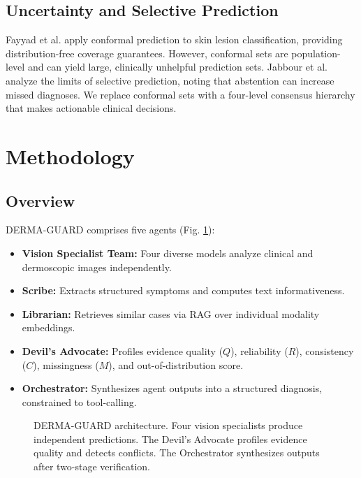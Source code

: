 \documentclass[conference]{IEEEtran}
\begin{document}
\subsection{Uncertainty and Selective Prediction}

Fayyad et al. \cite{fayyad2024} apply conformal prediction to skin lesion classification, providing distribution-free coverage guarantees. However, conformal sets are population-level and can yield large, clinically unhelpful prediction sets. Jabbour et al. \cite{jabbour2025} analyze the limits of selective prediction, noting that abstention can increase missed diagnoses. We replace conformal sets with a four-level consensus hierarchy that makes actionable clinical decisions.

\section{Methodology}
\label{sec:method}

\subsection{Overview}

DERMA-GUARD comprises five agents (Fig. \ref{fig:architecture}):

\begin{itemize}
    \item \textbf{Vision Specialist Team:} Four diverse models analyze clinical and dermoscopic images independently.
    \item \textbf{Scribe:} Extracts structured symptoms and computes text informativeness.
    \item \textbf{Librarian:} Retrieves similar cases via RAG over individual modality embeddings.
    \item \textbf{Devil's Advocate:} Profiles evidence quality ($Q$), reliability ($R$), consistency ($C$), missingness ($M$), and out-of-distribution score.
    \item \textbf{Orchestrator:} Synthesizes agent outputs into a structured diagnosis, constrained to tool-calling.
\end{itemize}

\begin{figure}[t]
\centering
{}
\caption{DERMA-GUARD architecture. Four vision specialists produce independent predictions. The Devil's Advocate profiles evidence quality and detects conflicts. The Orchestrator synthesizes outputs after two-stage verification.}
\label{fig:architecture}
\end{figure}
\end{document}
